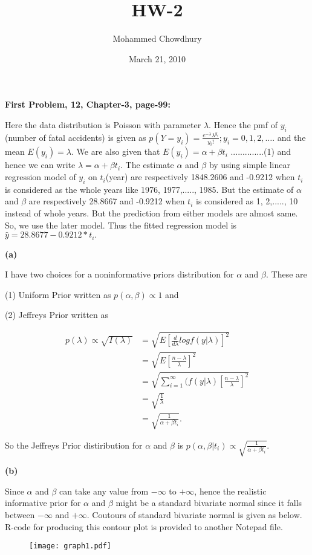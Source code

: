 \documentclass[10pt]{article}
\title{HW-2}
\author{Mohammed Chowdhury}
\date{March 21, 2010}
\begin{document}
\maketitle
\begin{center}
\textbf{First Problem, 12, Chapter-3, page-99:}
\end{center}
Here the data distribution is Poisson with parameter $\lambda.$ Hence the pmf of $y_{i}$(number of fatal accidents) is given as $p(Y=y_{i})=\frac{e^{-\lambda}{\lambda^{y_{i}}}}{y_{i}!}; y_{i}=0,1,2, \dots.$ and the mean $E(y_{i})=\lambda$. We are also given that $E(y_{i})=\alpha+\beta t_{i}$ ..............(1) and hence we can write $\lambda=\alpha+\beta t_{i}.$ The estimate $\alpha$ and $\beta$ by using simple linear regression model of $y_{i}$ on $t_{i}$(year) are respectively  1848.2606 and -0.9212 when $t_{i}$ is considered as the whole years like 1976, 1977,....., 1985. But the estimate of $\alpha$ and $\beta$ are respectively 28.8667 and -0.9212 when $t_{i}$ is considered as 1, 2,....., 10 instead of whole years. But the prediction from either models are almost same. So, we use the later model. Thus the fitted regression model is $\hat{y}=28.8677-0.9212*t_{i}.$

\textbf{(a)}

I have two choices for a noninformative priors distribution for $\alpha$ and $\beta$. These are 

(1) Uniform Prior written as $p(\alpha, \beta)\propto 1$ and 

(2) Jeffreys Prior written as 
 
\begin{equation*}
\begin{split}
p(\lambda)\propto \sqrt{I(\lambda)}&=\sqrt{E[\frac{d}{d\lambda}logf(y|\lambda)]^2}\\
&=\sqrt{E[\frac{n-\lambda}{\lambda}]^2}\\
&=\sqrt{\sum_{i=1}^\infty(f(y|\lambda)[\frac{n-\lambda}{\lambda}]^2}\\
&=\sqrt{\frac{1}{\lambda}}\\
&=\sqrt{\frac{1}{\alpha+\beta t_{i}}}.
\end{split}
\end{equation*}

So the Jeffreys Prior distiribution for $\alpha$ and $\beta$ is $p(\alpha, \beta|t_{i})\propto\sqrt{\frac{1}{\alpha+\beta t_{i}}}.$

\textbf{(b)}

Since $\alpha$ and $\beta$ can take any value from $-\infty$ to $+\infty$, hence the realistic informative prior for $\alpha$ and $\beta$ might be a standard bivariate normal since it falls between $-\infty$ and $+\infty$. Coutours of standard bivariate normal is given as below. R-code for producing this contour plot is provided to another Notepad file. 
\newpage
\begin{figure}[ht]
\centering
\texttt{[image: graph1.pdf]}
\end{figure}
\end{document}
